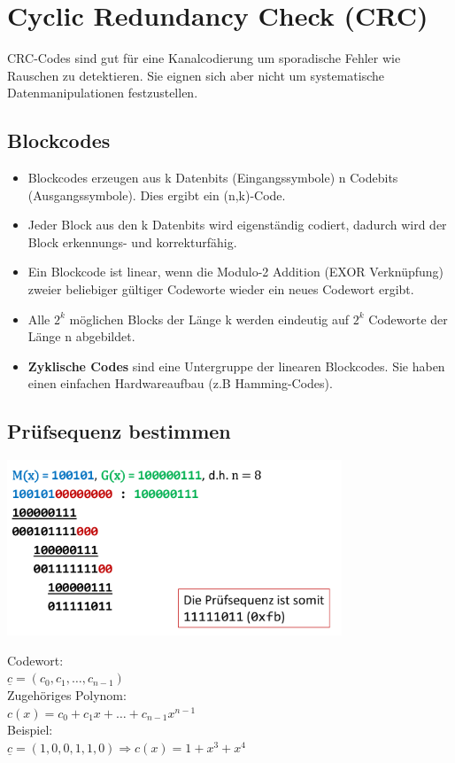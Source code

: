 \section{Cyclic Redundancy Check (CRC)}

  CRC-Codes sind gut für eine Kanalcodierung um sporadische Fehler wie Rauschen zu detektieren. Sie
  eignen sich aber nicht um systematische Datenmanipulationen festzustellen.

\subsection{Blockcodes }
  \begin{itemize}
    \item Blockcodes erzeugen aus k Datenbits (Eingangssymbole) n Codebits (Ausgangssymbole).
          Dies ergibt ein (n,k)-Code.
    \item Jeder Block aus den k Datenbits wird eigenständig codiert, dadurch wird der Block erkennungs-
          und korrekturfähig.
    \item Ein Blockcode ist linear, wenn die Modulo-2 Addition (EXOR Verknüpfung) zweier beliebiger gültiger
          Codeworte wieder ein neues Codewort ergibt.
    \item Alle $2^k$ möglichen Blocks der Länge k werden eindeutig auf $2^k$ Codeworte der Länge n abgebildet.
    \item \textbf{Zyklische Codes} sind eine Untergruppe der linearen Blockcodes. Sie haben einen einfachen
          Hardwareaufbau (z.B Hamming-Codes).
  \end{itemize}

\subsection{Prüfsequenz bestimmen}
  \begin{multicols}{2}
    \includegraphics[width=10cm]{images/CRC/CRCRechenBsp}
    
  \columnbreak

    Codewort:\\
    $\underline{c} = (c_0, c_1, \ldots, c_{n-1})$ \\
    
    Zugehöriges Polynom:\\
    $c(x) = c_0 + c_1x + \ldots + c_{n-1}x^{n-1}$\\
    
    Beispiel:\\
    $\underline{c} = (1,0,0,1,1,0) \Rightarrow c(x) = 1 + x^3+x^4$    
  \end{multicols}
  
